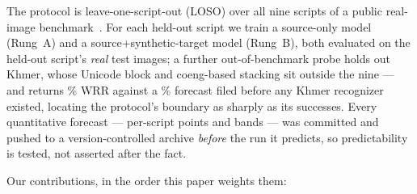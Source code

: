 The protocol is leave-one-script-out (LOSO) over all nine scripts of a public real-image
benchmark~\cite{bstd}. For each held-out script we train a source-only model (Rung~A) and a
source+synthetic-target model (Rung~B), both evaluated on the held-out script's \emph{real} test
images; a further out-of-benchmark probe holds out Khmer, whose Unicode block and coeng-based
stacking sit outside the nine --- and returns \khmerB\% WRR against a \khmerPred\% forecast filed
before any Khmer recognizer existed, locating the protocol's boundary as sharply as its successes.
Every quantitative forecast --- per-script points and bands --- was committed and pushed to a
version-controlled archive \emph{before} the run it predicts, so predictability is tested, not
asserted after the fact.

\medskip\noindent Our contributions, in the order this paper weights them:
